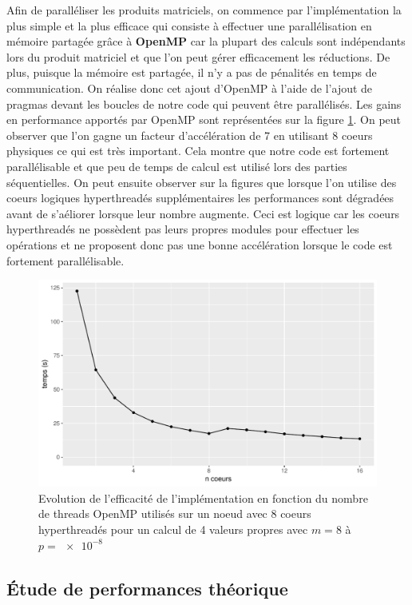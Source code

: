 \documentclass[11pt,a4paper]{article}
\begin{document}
		Afin de paralléliser les produits matriciels, on commence par l'implémentation la plus simple et la plus efficace qui consiste à effectuer une parallélisation en mémoire partagée grâce à \textbf{OpenMP} car la plupart des calculs sont indépendants lors du produit matriciel et que l'on peut gérer efficacement les réductions. De plus, puisque la mémoire est partagée, il n'y a pas de pénalités en temps de communication. On réalise donc cet ajout d'OpenMP à l'aide de l'ajout de pragmas devant les boucles de notre code qui peuvent être parallélisés. Les gains en performance apportés par OpenMP sont représentées sur la figure \ref{fig:omp_perf}. On peut observer que l'on gagne un facteur d'accélération de 7 en utilisant 8 coeurs physiques ce qui est très important. Cela montre que notre code est fortement parallélisable et que peu de temps de calcul est utilisé lors des parties séquentielles. On peut ensuite observer sur la figures que lorsque l'on utilise des coeurs logiques hyperthreadés supplémentaires les performances sont dégradées avant de s'aéliorer lorsque leur nombre augmente. Ceci est logique car les coeurs hyperthreadés ne possèdent pas leurs propres modules pour effectuer les opérations et ne proposent donc pas une bonne accélération lorsque le code est fortement parallélisable.
		\begin{figure}
			\includegraphics[width=\linewidth]{plots/omp_perf.pdf}
			\caption{Evolution de l'efficacité de l'implémentation en fonction du nombre de threads OpenMP utilisés sur un noeud avec 8 coeurs hyperthreadés pour un calcul de 4 valeurs propres avec $m = 8$ à $p=\SI{e-8}{}$ \label{fig:omp_perf}}
		\end{figure}

	\subsection{Étude de performances théorique}
\end{document}

